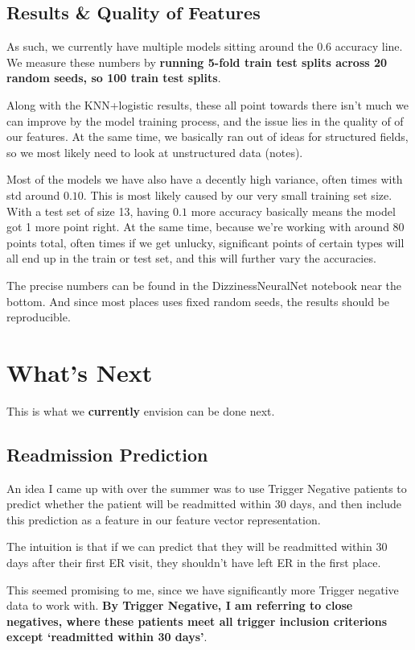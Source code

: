 \documentclass[12pt]{article}
\theoremstyle{definition}
\begin{document}
\subsection{Results \& Quality of Features}
As such, we currently have multiple models sitting around the $0.6$ accuracy line. We measure these numbers by \textbf{running 5-fold train test splits across 20 random seeds, so 100 train test splits}.

Along with the KNN+logistic results, these all point towards there isn't much we can improve by the model training process, and the issue lies in the quality of of our features. At the same time, we basically ran out of ideas for structured fields, so we most likely need to look at unstructured data (notes).

Most of the models we have also have a decently high variance, often times with std around $0.10$. This is most likely caused by our very small training set size. With a test set of size 13, having $0.1$ more accuracy basically means the model got 1 more point right. At the same time, because we're working with around 80 points total, often times if we get unlucky, significant points of certain types will all end up in the train or test set, and this will further vary the accuracies.

The precise numbers can be found in the DizzinessNeuralNet notebook near the bottom. And since most places uses fixed random seeds, the results should be reproducible.


\section{What's Next}
This is what we \textbf{currently} envision can be done next.

\subsection{Readmission Prediction}
An idea I came up with over the summer was to use Trigger Negative patients to predict whether the patient will be readmitted within 30 days, and then include this prediction as a feature in our feature vector representation.

The intuition is that if we can predict that they will be readmitted within 30 days after their first ER visit, they shouldn't have left ER in the first place. 

This seemed promising to me, since we have significantly more Trigger negative data to work with. \textbf{By Trigger Negative, I am referring to close negatives, where these patients meet all trigger inclusion criterions except `readmitted within 30 days'}.
\end{document}
